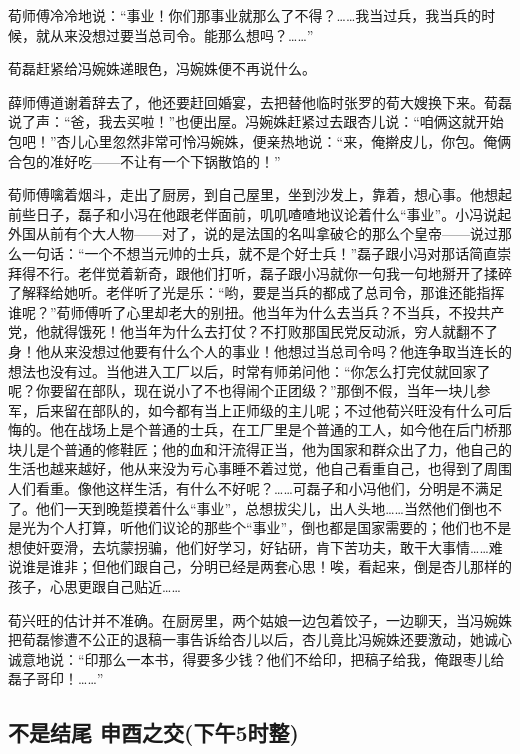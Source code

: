 \par 荀师傅冷冷地说：“事业！你们那事业就那么了不得？……我当过兵，我当兵的时候，就从来没想过要当总司令。能那么想吗？……”
\par 荀磊赶紧给冯婉姝递眼色，冯婉姝便不再说什么。
\par 薛师傅道谢着辞去了，他还要赶回婚宴，去把替他临时张罗的荀大嫂换下来。荀磊说了声：“爸，我去买啦！”也便出屋。冯婉姝赶紧过去跟杏儿说：“咱俩这就开始包吧！”杏儿心里忽然非常可怜冯婉姝，便亲热地说：“来，俺擀皮儿，你包。俺俩合包的准好吃——不让有一个下锅散馅的！”
\par 荀师傅噙着烟斗，走出了厨房，到自己屋里，坐到沙发上，靠着，想心事。他想起前些日子，磊子和小冯在他跟老伴面前，叽叽喳喳地议论着什么“事业”。小冯说起外国从前有个大人物——对了，说的是法国的名叫拿破仑的那么个皇帝——说过那么一句话：“一个不想当元帅的士兵，就不是个好士兵！”磊子跟小冯对那话简直崇拜得不行。老伴觉着新奇，跟他们打听，磊子跟小冯就你一句我一句地掰开了揉碎了解释给她听。老伴听了光是乐：“哟，要是当兵的都成了总司令，那谁还能指挥谁呢？”荀师傅听了心里却老大的别扭。他当年为什么去当兵？不当兵，不投共产党，他就得饿死！他当年为什么去打仗？不打败那国民党反动派，穷人就翻不了身！他从来没想过他要有什么个人的事业！他想过当总司令吗？他连争取当连长的想法也没有过。当他进入工厂以后，时常有师弟问他：“你怎么打完仗就回家了呢？你要留在部队，现在说小了不也得闹个正团级？”那倒不假，当年一块儿参军，后来留在部队的，如今都有当上正师级的主儿呢；不过他荀兴旺没有什么可后悔的。他在战场上是个普通的士兵，在工厂里是个普通的工人，如今他在后门桥那块儿是个普通的修鞋匠；他的血和汗流得正当，他为国家和群众出了力，他自己的生活也越来越好，他从来没为亏心事睡不着过觉，他自己看重自己，也得到了周围人们看重。像他这样生活，有什么不好呢？……可磊子和小冯他们，分明是不满足了。他们一天到晚踅摸着什么“事业”，总想拔尖儿，出人头地……当然他们倒也不是光为个人打算，听他们议论的那些个“事业”，倒也都是国家需要的；他们也不是想使奸耍滑，去坑蒙拐骗，他们好学习，好钻研，肯下苦功夫，敢干大事情……难说谁是谁非；但他们跟自己，分明已经是两套心思！唉，看起来，倒是杏儿那样的孩子，心思更跟自己贴近……
\par 荀兴旺的估计并不准确。在厨房里，两个姑娘一边包着饺子，一边聊天，当冯婉姝把荀磊惨遭不公正的退稿一事告诉给杏儿以后，杏儿竟比冯婉姝还要激动，她诚心诚意地说：“印那么一本书，得要多少钱？他们不给印，把稿子给我，俺跟枣儿给磊子哥印！……”






\subsection*{不是结尾 申酉之交(下午5时整)}



